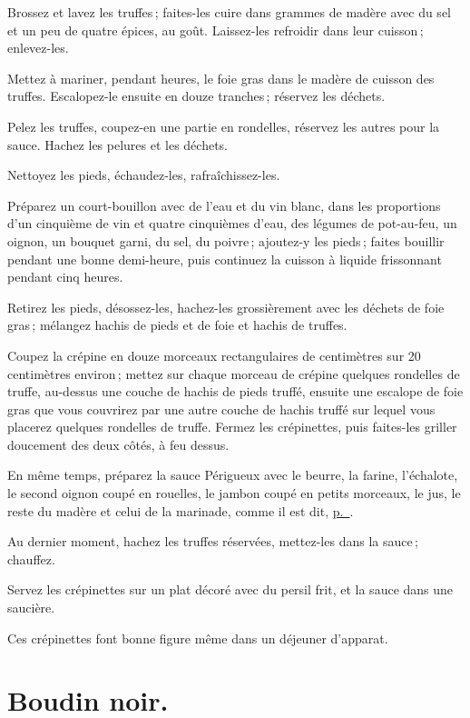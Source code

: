 Brossez et lavez les truffes ; faites-les cuire dans {\mmm} grammes de madère avec
du sel et un peu de quatre épices, au goût. Laissez-les refroidir dans leur
cuisson ; enlevez-les.

Mettez à mariner, pendant {\mmm} heures, le foie gras dans le madère de cuisson
des truffes. Escalopez-le ensuite en douze tranches ; réservez les déchets.

Pelez les truffes, coupez-en une partie en rondelles, réservez les autres pour la
sauce. Hachez les pelures et les déchets.

Nettoyez les pieds, échaudez-les, rafraîchissez-les.

Préparez un court-bouillon avec de l’eau et du vin blanc, dans les proportions
d'un cinquième de vin et quatre cinquièmes d'eau, des légumes de pot-au-feu, un
oignon, un bouquet garni, du sel, du poivre ; ajoutez-y les pieds ; faites
bouillir pendant une bonne demi-heure, puis continuez la cuisson à liquide
frissonnant pendant cinq heures.

Retirez les pieds, désossez-les, hachez-les grossièrement avec les déchets de
foie gras ; mélangez hachis de pieds et de foie et hachis de truffes.

Coupez la crépine en douze morceaux rectangulaires de {\mmm} centimètres sur 20
centimètres environ ; mettez sur chaque morceau de crépine quelques rondelles
de truffe, au-dessus une couche de hachis de pieds truffé, ensuite une escalope
de foie gras que vous couvrirez par une autre couche de hachis truffé sur
lequel vous placerez quelques rondelles de truffe. Fermez les crépinettes, puis
faites-les griller doucement des deux côtés, à feu dessus.

En même temps, préparez la sauce Périgueux avec le beurre, la farine,
l'échalote, le second oignon coupé en rouelles, le jambon coupé en petits
morceaux, le jus, le reste du madère et celui de la marinade, comme il est dit,
\hyperlink{p0540}{p. \pageref{pg0540}}.

Au dernier moment, hachez les truffes réservées, mettez-les dans la sauce ;
chauffez.

Servez les crépinettes sur un plat décoré avec du persil frit, et la sauce dans une
saucière.

Ces crépinettes font bonne figure même dans un déjeuner d'apparat.

\section*{\centering Boudin noir.}
{}

